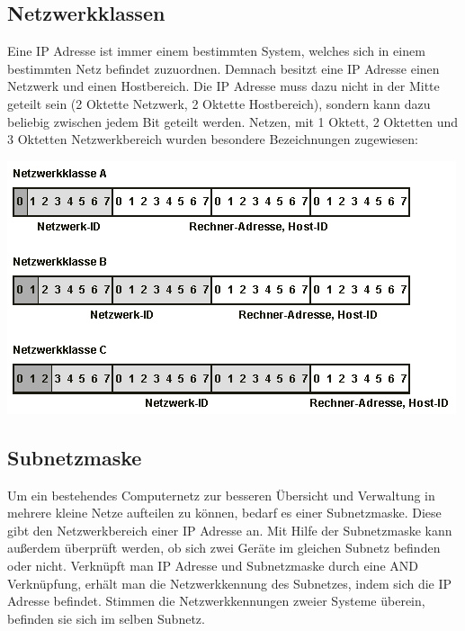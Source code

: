 \documentclass[12pt,a4paper]{article}
\begin{document}
\subsection{Netzwerkklassen}
Eine IP Adresse ist immer einem bestimmten System, welches sich in einem bestimmten Netz befindet zuzuordnen. Demnach besitzt eine IP Adresse einen Netzwerk und einen Hostbereich. Die IP Adresse muss dazu nicht in der Mitte geteilt sein (2 Oktette Netzwerk, 2 Oktette Hostbereich), sondern kann dazu beliebig zwischen jedem Bit geteilt werden. Netzen, mit 1 Oktett, 2 Oktetten und 3 Oktetten Netzwerkbereich wurden besondere Bezeichnungen zugewiesen:
\begin{center}
\includegraphics[scale=0.7]{Bilder/Netzwerkklassen.png}
\end{center}
\subsection{Subnetzmaske}
Um ein bestehendes Computernetz zur besseren Übersicht und Verwaltung in mehrere kleine Netze aufteilen zu können, bedarf es einer Subnetzmaske. Diese gibt den Netzwerkbereich einer IP Adresse an. Mit Hilfe der Subnetzmaske kann außerdem überprüft werden, ob sich zwei Geräte im gleichen Subnetz befinden oder nicht. Verknüpft man IP Adresse und Subnetzmaske durch eine AND Verknüpfung, erhält man die Netzwerkkennung des Subnetzes, indem sich die IP Adresse befindet. Stimmen die Netzwerkkennungen zweier Systeme überein, befinden sie sich im selben Subnetz.
\end{document}
